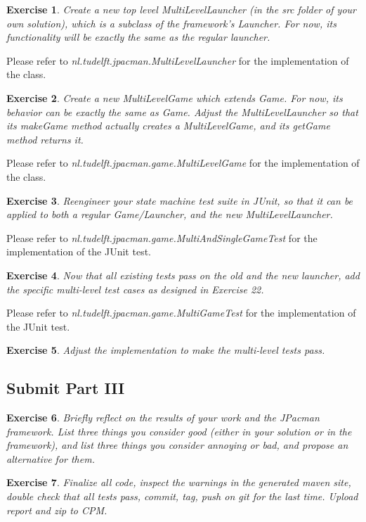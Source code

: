 \documentclass[a4paper]{article}
\newtheorem{thm}{Exercise}
\begin{document}
    \begin{thm}
      Create a new top level MultiLevelLauncher (in the \textit{src} folder of your own solution),
      which is a subclass of the framework’s Launcher.
      For now, its functionality will be exactly the same as the regular launcher.
    \end{thm}
    Please refer to \textit{nl.tudelft.jpacman.MultiLevelLauncher} for the implementation of the class.
    
    \newpage
    \begin{thm}
      Create a new MultiLevelGame which extends Game.
      For now, its behavior can be exactly the same as Game.
      Adjust the MultiLevelLauncher so that its makeGame method actually creates a MultiLevelGame,
      and its getGame method returns it.
    \end{thm}
    Please refer to \textit{nl.tudelft.jpacman.game.MultiLevelGame} for the implementation of the class.
    
    \begin{thm}
      Reengineer your state machine test suite in JUnit, so that it can be applied to both a regular Game/Launcher, and the new MultiLevelLauncher.
    \end{thm}
    Please refer to \textit{nl.tudelft.jpacman.game.MultiAndSingleGameTest} for the implementation of the JUnit test.
    
    \begin{thm}
      Now that all existing tests pass on the old and the new launcher, add the specific multi-level test cases as designed in Exercise 22.
    \end{thm}
    Please refer to \textit{nl.tudelft.jpacman.game.MultiGameTest} for the implementation of the JUnit test.
    
    \begin{thm}
      Adjust the implementation to make the multi-level tests pass.
    \end{thm}
    
  \subsection{Submit Part III}
    \begin{thm}
      Briefly reflect on the results of your work and the JPacman framework.
      List three things you consider good (either in your solution or in the framework),
      and list three things you consider annoying or bad, and propose an alternative for them.
    \end{thm}
  
    \begin{thm}
      Finalize all code, inspect the warnings in the generated maven site, double check
      that all tests pass, commit, tag, push on git for the last time. Upload report and zip to CPM.
    \end{thm}
\end{document}
